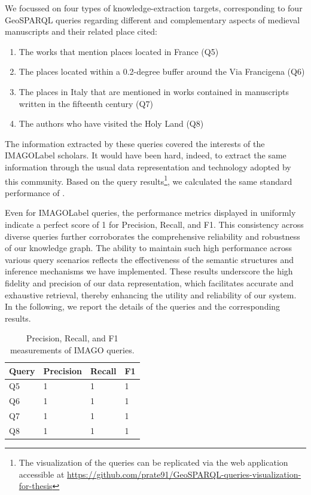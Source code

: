 We focussed on four types of knowledge-extraction targets, corresponding to four GeoSPARQL queries regarding different and complementary aspects of medieval manuscripts and their related place cited:
\begin{enumerate}
    \item The works that mention places located in France (Q5)
    \item The places located within a 0.2-degree buffer around the Via Francigena (Q6)
    \item The places in Italy that are mentioned in works contained in manuscripts written in the fifteenth century (Q7)
    \item The authors who have visited the Holy Land (Q8)
\end{enumerate}

The information extracted by these queries covered the interests of the \acrshort{IMAGOLabel} scholars. It would have been hard, indeed, to extract the same information through the usual data representation and technology adopted by this community. Based on the query results\footnote{The visualization of the queries can be replicated via the web application accessible at \url{https://github.com/prate91/GeoSPARQL-queries-visualization-for-thesis}}, we calculated the same standard performance of . 

Even for \acrshort{IMAGOLabel} queries, the performance metrics displayed in  uniformly indicate a perfect score of 1 for Precision, Recall, and F1. This consistency across diverse queries further corroborates the comprehensive reliability and robustness of our knowledge graph. The ability to maintain such high performance across various query scenarios reflects the effectiveness of the semantic structures and inference mechanisms we have implemented. These results underscore the high fidelity and precision of our data representation, which facilitates accurate and exhaustive retrieval, thereby enhancing the utility and reliability of our system. In the following, we report the details of the queries and the corresponding results.

\begin{table}[H]
    \centering
        \caption{Precision, Recall, and F1 measurements of IMAGO queries.}
    \label{tab:evaluationQueriesIMAGO}
    \begin{tabular}{|l|l|l|l|}
    \hline
 Query & Precision & Recall & F1\\
\hline
        Q5 & 1 & 1 & 1\\ \hline
        Q6 & 1 & 1 & 1\\ \hline
        Q7 & 1 & 1 & 1 \\  \hline
        Q8 & 1 & 1 & 1 \\ \hline
    \end{tabular}
\end{table}

